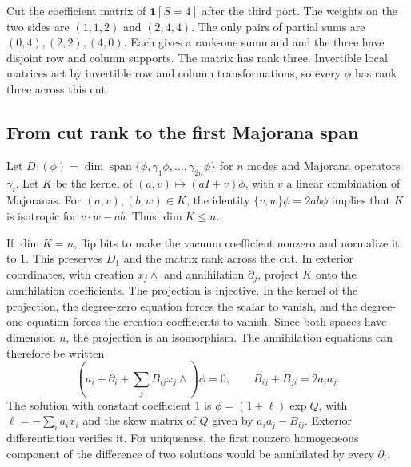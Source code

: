 \documentclass[11pt,a4paper]{article}
\numberwithin{equation}{section}
\begin{document}
Cut the coefficient matrix of \(\mathbf 1[S=4]\) after the third port. The weights on the two sides are \((1,1,2)\) and \((2,4,4)\). The only pairs of partial sums are \((0,4),(2,2),(4,0)\). Each gives a rank-one summand and the three have disjoint row and column supports. The matrix has rank three. Invertible local matrices act by invertible row and column transformations, so every \(\phi\) has rank three across this cut.

\subsection{From cut rank to the first Majorana span}\label{from-cut-rank-to-the-first-majorana-span}

Let \(D_1(\phi)=\dim\operatorname{span}\{\phi,\gamma_1\phi,\dots,\gamma_{2n}\phi\}\) for \(n\) modes and Majorana operators \(\gamma_i\). Let \(K\) be the kernel of \((a,v)\mapsto(aI+v)\phi\), with \(v\) a linear combination of Majoranas. For \((a,v),(b,w)\in K\), the identity \(\{v,w\}\phi=2ab\phi\) implies that \(K\) is isotropic for \(v\cdot w-ab\). Thus \(\dim K\le n\).

If \(\dim K=n\), flip bits to make the vacuum coefficient nonzero and normalize it to \(1\). This preserves \(D_1\) and the matrix rank across the cut. In exterior coordinates, with creation \(x_j\wedge\) and annihilation \(\partial_j\), project \(K\) onto the annihilation coefficients. The projection is injective. In the kernel of the projection, the degree-zero equation forces the scalar to vanish, and the degree-one equation forces the creation coefficients to vanish. Since both spaces have dimension \(n\), the projection is an isomorphism. The annihilation equations can therefore be written
\begin{equation}\label{eq:annihilation-equations}
\left(a_i+\partial_i+\sum_j B_{ij}x_j\wedge\right)\phi=0,\qquad
B_{ij}+B_{ji}=2a_i a_j .
\end{equation}
The solution with constant coefficient \(1\) is \(\phi=(1+\ell)\exp Q\), with \(\ell=-\sum_i a_i x_i\) and the skew matrix of \(Q\) given by \(a_i a_j-B_{ij}\). Exterior differentiation verifies it. For uniqueness, the first nonzero homogeneous component of the difference of two solutions would be annihilated by every \(\partial_i\).
\end{document}

